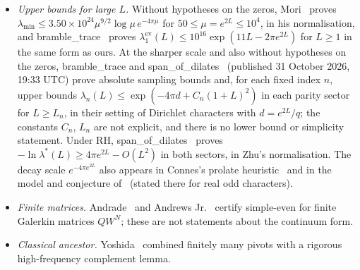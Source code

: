 \documentclass[11pt]{amsart}
\newcommand{\ev}{\mathrm{ev}}
\theoremstyle{definition}
\theoremstyle{remark}
\numberwithin{equation}{section}
\begin{document}
\begin{itemize}
\item \emph{Upper bounds for large $L$.} Without hypotheses on the zeros, Mori~\cite[Thm.~K(a)]{MoriV} proves $\lambda_{\min}\le3.50\times10^{24}\mu^{9/2}\log\mu\,e^{-4\pi\mu}$ for $50\le\mu=e^{2L}\le10^4$, in his normalisation, and bramble\_trace~\cite[Thm.~2.1]{rh25} proves $\lambda_1^\ev(L)\le10^{16}\exp(11L-2\pi e^{2L})$ for $L\ge1$ in the same form as ours. At the sharper scale and also without hypotheses on the zeros, bramble\_trace and span\_of\_dilates~\cite[Thm.~1, Cor.~2]{rh83} (published 31 October 2026, 19:33 UTC) prove absolute sampling bounds and, for each fixed index $n$, upper bounds $\lambda_n(L)\le\exp(-4\pi d+C_n(1+L)^2)$ in each parity sector for $L\ge L_n$, in their setting of Dirichlet characters with $d=e^{2L}/q$; the constants $C_n$, $L_n$ are not explicit, and there is no lower bound or simplicity statement. Under RH, span\_of\_dilates~\cite[Thm.~1]{rh81} proves $-\ln\lambda^*(L)\ge4\pi e^{2L}-O(L^2)$ in both sectors, in Zhu's normalisation. The decay scale $e^{-4\pi e^{2L}}$ also appears in Connes's prolate heuristic~\cite{Connes26} and in the model and conjecture of~\cite[Prop.~4.1, Conj.~4.2(a)]{rh80} (stated there for real odd characters).
\item \emph{Finite matrices.} Andrade~\cite{Andrade2} and Andrews Jr.~\cite{AndrewsJr} certify simple-even for finite Galerkin matrices $QW^N$; these are not statements about the continuum form.
\item \emph{Classical ancestor.} Yoshida~\cite{Yoshida} combined finitely many pivots with a rigorous high-frequency complement lemma.
\end{itemize}
\end{document}
